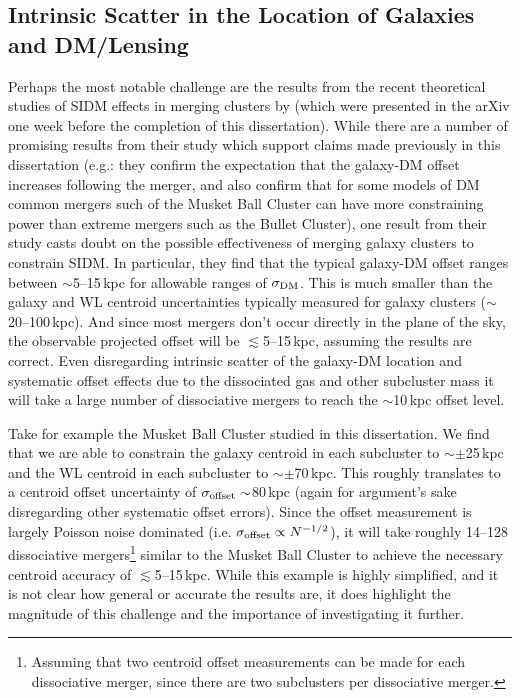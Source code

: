 {\subsection{Intrinsic Scatter in the Location of Galaxies and DM/Lensing}

Perhaps the most notable challenge are the results from the recent theoretical studies of SIDM effects in merging clusters by \citet{Kahlhoefer:2013wp} (which were presented in the arXiv one week before the completion of this dissertation).
While there are a number of promising results from their study which support claims made previously in this dissertation (e.g.: they confirm the expectation that the galaxy-DM offset increases following the merger, and also confirm that for some models of DM common mergers such of the Musket Ball Cluster can have more constraining power than extreme mergers such as the Bullet Cluster), one result from their study casts doubt on the possible effectiveness of merging galaxy clusters to constrain SIDM.
In particular, they find that the typical galaxy-DM offset ranges between $\sim$5--15\,kpc for allowable ranges of $\sigma_{\rm DM}$.
This is much smaller than the galaxy and WL centroid uncertainties typically measured for galaxy clusters ($\sim$20--100\,kpc).
And since most mergers don't occur directly in the plane of the sky, the observable projected offset will be $\lesssim$5--15\,kpc, assuming the \citet{Kahlhoefer:2013wp} results are correct.
Even disregarding intrinsic scatter of the galaxy-DM location and systematic offset effects due to the dissociated gas and other subcluster mass it will take a large number of dissociative mergers to reach the $\sim$10\,kpc offset level.

Take for example the Musket Ball Cluster studied in this dissertation.
We find that we are able to constrain the galaxy centroid in each subcluster to $\sim\pm$25\,kpc and the WL centroid in each subcluster to $\sim\pm$70\,kpc.
This roughly translates to a centroid offset uncertainty of $\sigma_{\rm offset}\sim$80\,kpc (again for argument's sake disregarding other systematic offset errors).
Since the offset measurement is largely Poisson noise dominated (i.e. $\sigma_{\rm offset}\propto N^{-1/2}$), it will take roughly 14--128 dissociative mergers\footnote{Assuming that two centroid offset measurements can be made for each dissociative merger, since there are two subclusters per dissociative merger.} similar to the Musket Ball Cluster to achieve the necessary centroid accuracy of $\lesssim$5--15\,kpc.
While this example is highly simplified, and it is not clear how general or accurate the \citet{Kahlhoefer:2013wp} results are,  it does highlight the magnitude of this challenge and the importance of investigating it further.

}
